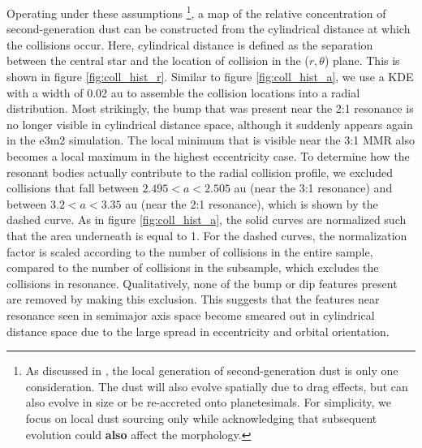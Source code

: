 \documentclass[fleqn,usenatbib]{mnras}
\begin{document}
Operating under these assumptions \footnote{As discussed in \cite{2017ApJ...850..103B}, the local generation of second-generation dust is only one 
consideration. The dust will also evolve spatially due to drag effects, but can also evolve in size or be re-accreted onto planetesimals. For simplicity, 
we focus on local dust sourcing only while acknowledging that subsequent evolution could \textbf{also} affect the morphology.}, a map of the relative concentration 
of second-generation dust can be constructed from the cylindrical distance at which the collisions occur. Here, cylindrical distance is defined as the separation between the central 
star and the location of collision in the ($r, \theta$) plane. This is shown in figure \ref{fig:coll_hist_r}. 
Similar to figure \ref{fig:coll_hist_a}, we use a KDE with a width of 0.02 au to assemble the collision locations into a radial distribution. Most 
strikingly, the bump that was present near the 2:1 resonance is no longer visible in cylindrical distance space, although it suddenly appears again in 
the e3m2 simulation. The local minimum that is visible near the 3:1 MMR also becomes a local maximum in the highest eccentricity case. To determine how the resonant 
bodies actually contribute to the radial collision profile, we excluded collisions that fall between $2.495 < a < 2.505$ au (near the 3:1 resonance) and 
between $3.2 < a < 3.35$ au (near the 2:1 resonance), which is shown by the dashed curve. As in figure \ref{fig:coll_hist_a}, the solid curves are normalized such that the area 
underneath is equal to 1. For the dashed curves, the normalization factor is scaled according to the number of collisions in the entire sample, compared to the number of collisions in the 
subsample, which excludes the collisions in resonance. Qualitatively, none of the bump or dip features present 
are removed by making this exclusion. This suggests that the features near resonance seen in semimajor axis space become smeared out in 
cylindrical distance space due to the large spread in eccentricity and orbital orientation.
\end{document}
